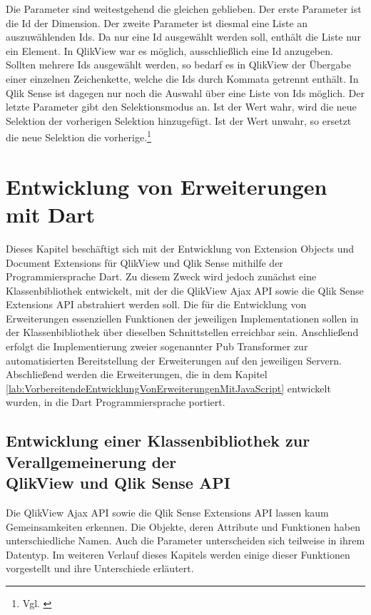 Die Parameter sind weitestgehend die gleichen geblieben. Der erste Parameter ist die Id der Dimension. Der zweite Parameter ist diesmal eine Liste an auszuwählenden Ids. Da nur eine Id ausgewählt werden soll, enthält die Liste nur ein Element. In QlikView war es möglich, ausschließlich eine Id anzugeben. Sollten mehrere Ids ausgewählt werden, so bedarf es in QlikView der Übergabe einer einzelnen Zeichenkette, welche die Ids durch Kommata getrennt enthält. In Qlik Sense ist dagegen nur noch die Auswahl über eine Liste von Ids möglich. Der letzte Parameter gibt den Selektionsmodus an. Ist der Wert wahr, wird die neue Selektion der vorherigen Selektion hinzugefügt. Ist der Wert unwahr, so ersetzt die neue Selektion die vorherige.\footnote{Vgl. \cite{JsDocReferenceQvDocumentObjectDataSelectValuesInColumn}}



\section{Entwicklung von Erweiterungen mit Dart}
\label{lab:EntwicklungVonErweiterungenMitDart} 

Dieses Kapitel beschäftigt sich mit der Entwicklung von Extension Objects und Document Extensions für QlikView und Qlik Sense mithilfe der Programmiersprache Dart. Zu diesem Zweck wird jedoch zunächst eine Klassen\-bibliothek entwickelt, mit der die QlikView Ajax API sowie die Qlik Sense Extensions API abstrahiert werden soll. Die für die Entwicklung von Erweiterungen essenziellen Funktionen der jeweiligen Implementationen sollen in der Klassen\-bibliothek über dieselben Schnittstellen erreichbar sein. Anschließend erfolgt die Implementierung zweier sogenannter Pub Transformer zur automatisierten Bereitstellung der Erweiterungen auf den jeweiligen Servern. Abschließend werden die Erweiterungen, die in dem Kapitel \ref{lab:VorbereitendeEntwicklungVonErweiterungenMitJavaScript} entwickelt wurden, in die Dart Programmiersprache portiert.

\subsection{Entwicklung einer Klassenbibliothek zur Verallgemeinerung der \\QlikView und Qlik Sense API}
\label{lab:EntwicklungKlassenbibliothekVerallgemeinerungQlikViewQlikSenseAPI} 

Die QlikView Ajax API sowie die Qlik Sense Extensions API lassen kaum Gemeinsam\-keiten erkennen. Die Objekte, deren Attribute und Funktionen haben unterschiedliche Namen. Auch die Parameter unterscheiden sich teilweise in ihrem Daten\-typ. Im weiteren Verlauf dieses Kapitels werden einige dieser Funktionen vorgestellt und ihre Unterschiede erläutert.

